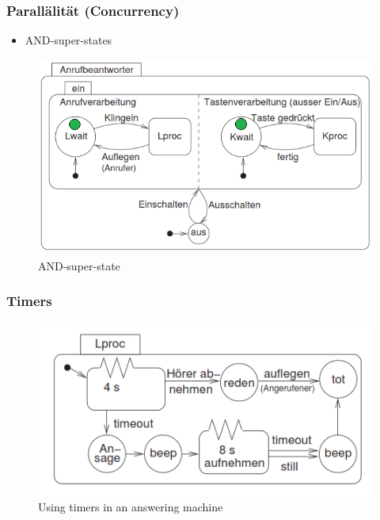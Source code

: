 \subsubsection{Parallälität (Concurrency)}
\begin{itemize}
  \item AND-super-states
\end{itemize}

\begin{figure}[htbp]
  \centering
  {\includegraphics[scale = 0.4]{images/FSM/AND_super_state}  
  \caption{AND-super-state}
  \label{fig:AND_super_state}}
\end{figure} 

\subsubsection{Timers}
\begin{figure}[htbp]
  \centering
  {\includegraphics[scale = 0.4]{images/FSM/timer}  
  \caption{Using timers in an  answering machine}
  \label{fig:timer}}
\end{figure} 
